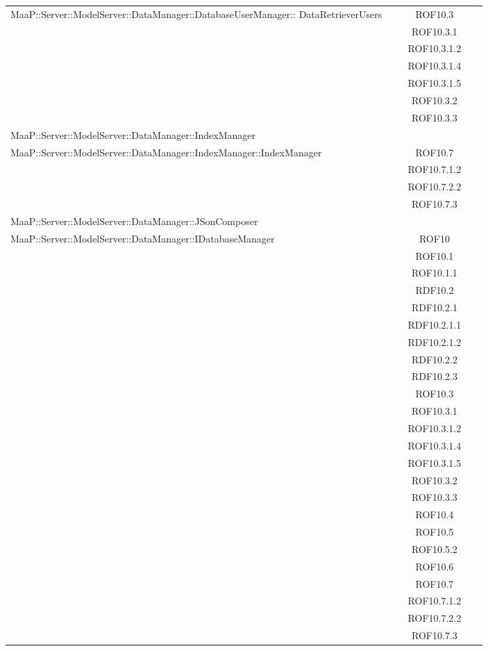 \begin{center}
\begin{longtable}{|p{0.8\linewidth}|c|}
\midrule 
MaaP::Server::ModelServer::DataManager::DatabaseUserManager:: DataRetrieverUsers
& ROF10.3\\
& ROF10.3.1\\
& ROF10.3.1.2\\
& ROF10.3.1.4\\
& ROF10.3.1.5\\
& ROF10.3.2\\
& ROF10.3.3\\


\midrule 
MaaP::Server::ModelServer::DataManager::IndexManager
& \\

\midrule 
MaaP::Server::ModelServer::DataManager::IndexManager::IndexManager
& ROF10.7\\
& ROF10.7.1.2\\
& ROF10.7.2.2\\
& ROF10.7.3\\

\midrule 
MaaP::Server::ModelServer::DataManager::JSonComposer
& \\

\midrule 
MaaP::Server::ModelServer::DataManager::IDatabaseManager
& ROF10\\
& ROF10.1\\
& ROF10.1.1\\
& RDF10.2\\
& RDF10.2.1\\
& RDF10.2.1.1\\
& RDF10.2.1.2\\
& RDF10.2.2\\
& RDF10.2.3\\
& ROF10.3\\
& ROF10.3.1\\
& ROF10.3.1.2\\
& ROF10.3.1.4\\
& ROF10.3.1.5\\
& ROF10.3.2\\
& ROF10.3.3\\
& ROF10.4\\
& ROF10.5\\
& ROF10.5.2\\
& ROF10.6\\
& ROF10.7\\
& ROF10.7.1.2\\
& ROF10.7.2.2\\
& ROF10.7.3\\



\end{longtable}
\end{center}
